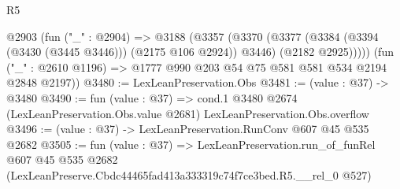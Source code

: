 \begin{lexlean}{R5}
\begin{coremodule}
      @2903
        (fun ("_" : @2904) =>
        @3188
          (@3357
            (@3370
              (@3377 (@3384 (@3394 (@3430 (@3445 @3446))) (@2175 @106 @2924)) @3446)
              (@2182 @2925)))))
      (fun ("_" : @2610 @1196) => @1777 @990 @203 @54 @75 @581 @581 @534 @2194 @2848 @2197))
@3480 := LexLeanPreservation.Obs
@3481 := (value : @37) -> @3480
@3490 := fun (value : @37) =>
  cond.{1} @3480 @2674 (LexLeanPreservation.Obs.value @2681) LexLeanPreservation.Obs.overflow
@3496 := (value : @37) -> LexLeanPreservation.RunConv @607 @45 @535 @2682
@3505 := fun (value : @37) =>
  LexLeanPreservation.run_of_funRel
    @607
    @45
    @535
    @2682
    (LexLeanPreserve.Cbdc44465fad413a333319c74f7ce3bed.R5.__rel_0 @527)
\end{coremodule}
\end{lexlean}
